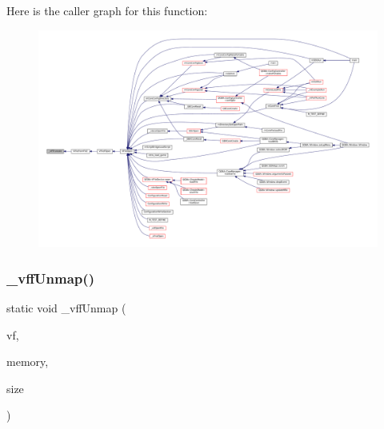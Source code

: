 Here is the caller graph for this function\+:
\nopagebreak
\begin{figure}[H]
\begin{center}
\leavevmode
\includegraphics[width=350pt]{vfs-file_8c_a44e1cdacc71a8e16868d8c968e644ec6_icgraph}
\end{center}
\end{figure}
\mbox{\label{vfs-file_8c_a359856c1b2b58f1cb08c962ff0bbd6f7}} 
\subsubsection{\texorpdfstring{\+\_\+vff\+Unmap()}{\_vffUnmap()}}
{\footnotesize\ttfamily static void \+\_\+vff\+Unmap (\begin{DoxyParamCaption}\item[{struct V\+File $\ast$}]{vf,  }\item[{void $\ast$}]{memory,  }\item[{size\+\_\+t}]{size }\end{DoxyParamCaption})\hspace{0.3cm}{\ttfamily [static]}}

